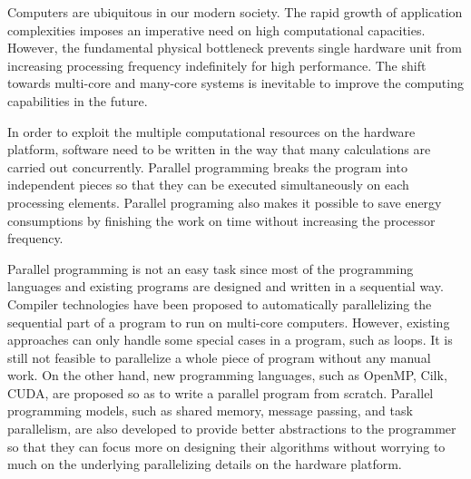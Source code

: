 

%
%

Computers are ubiquitous in our modern society. The rapid growth of application complexities imposes an imperative need on high computational capacities. However, the fundamental physical bottleneck prevents single hardware unit from increasing processing frequency indefinitely for high performance. The shift towards multi-core and many-core systems is inevitable to improve the computing capabilities in the future. 
\bigskip

In order to exploit the multiple computational resources on the hardware platform, software need to be written in the way that many calculations are carried out concurrently. Parallel programming breaks the program into independent pieces so that they can be executed simultaneously on each processing elements. Parallel programing also makes it possible to save energy consumptions by finishing the work on time without increasing the processor frequency. 
\bigskip

Parallel programming is not an easy task since most of the programming languages and existing programs are designed and written in a sequential way. Compiler technologies have been proposed to automatically parallelizing the sequential part of a program to run on multi-core computers. However, existing approaches can only handle some special cases in a program, such as loops. It is still not feasible to parallelize a whole piece of program without any manual work. On the other hand, new programming languages, such as OpenMP, Cilk, CUDA, are proposed so as to write a parallel program from scratch. Parallel programming models, such as  shared memory, message passing, and task parallelism, are also developed to provide better abstractions to the programmer so that they can focus more on designing their algorithms without worrying to much on the underlying parallelizing details on the hardware platform. 
\bigskip

